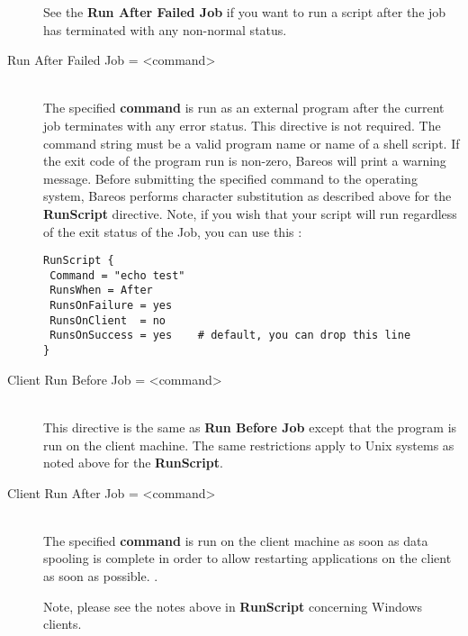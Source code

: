 \begin{description}

See the {\bf Run After Failed Job} if you
want to run a script after the job has terminated with any
non-normal status.

\item [Run After Failed Job = {\textless}command{\textgreater}] \hfill \\
The specified {\bf command} is run as an external program after the current
job terminates with any error status.  This directive is not required.  The
command string must be a valid program name or name of a shell script. If
the exit code of the program run is non-zero, Bareos will print a
warning message. Before submitting the specified command to the
operating system, Bareos performs character substitution as described above
for the {\bf RunScript} directive. Note, if you wish that your script
will run regardless of the exit status of the Job, you can use this :

\begin{verbatim}
RunScript {
 Command = "echo test"
 RunsWhen = After
 RunsOnFailure = yes
 RunsOnClient  = no
 RunsOnSuccess = yes    # default, you can drop this line
}
\end{verbatim}


\item [Client Run Before Job = {\textless}command{\textgreater}] \hfill \\
This directive is the same as {\bf Run Before Job} except that the
program is run on the client machine.  The same restrictions apply to
Unix systems as noted above for the {\bf RunScript}.

\item [Client Run After Job = {\textless}command{\textgreater}] \hfill \\
The specified {\bf command} is run on the client machine as soon
as data spooling is complete in order to allow restarting applications
on the client as soon as possible. .

Note, please see the notes above in {\bf RunScript}
concerning Windows clients.


\end{description}
